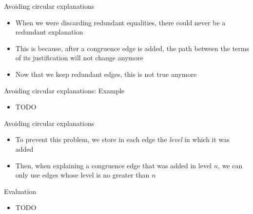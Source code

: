 \documentclass[aspectratio=169]{beamer}
\newcommand\vitem{\vfill\item}
\newcommand\pvitem{\pause\vfill\item}
\begin{document}
\begin{frame}{Avoiding circular explanations}
  \begin{itemize}
    \item When we were discarding redundant equalities, there could never be a
    redundant explanation
    \vitem This is because, after a congruence edge is added, the path between
    the terms of its justification will not change anymore
    \pvitem Now that we keep redundant edges, this is not true anymore
  \end{itemize}
\end{frame}

\begin{frame}{Avoiding circular explanations: Example}
  \begin{itemize}
    \item TODO
  \end{itemize}
\end{frame}

\begin{frame}{Avoiding circular explanations}
  \begin{itemize}
    \item To prevent this problem, we store in each edge the \emph{level} in
    which it was added
    \vitem Then, when explaining a congruence edge that was added in level $n$,
    we can only use edges whose level is no greater than $n$
  \end{itemize}
\end{frame}

\begin{frame}{Evaluation}
  \begin{itemize}
    \item TODO
  \end{itemize}
\end{frame}
\end{document}

